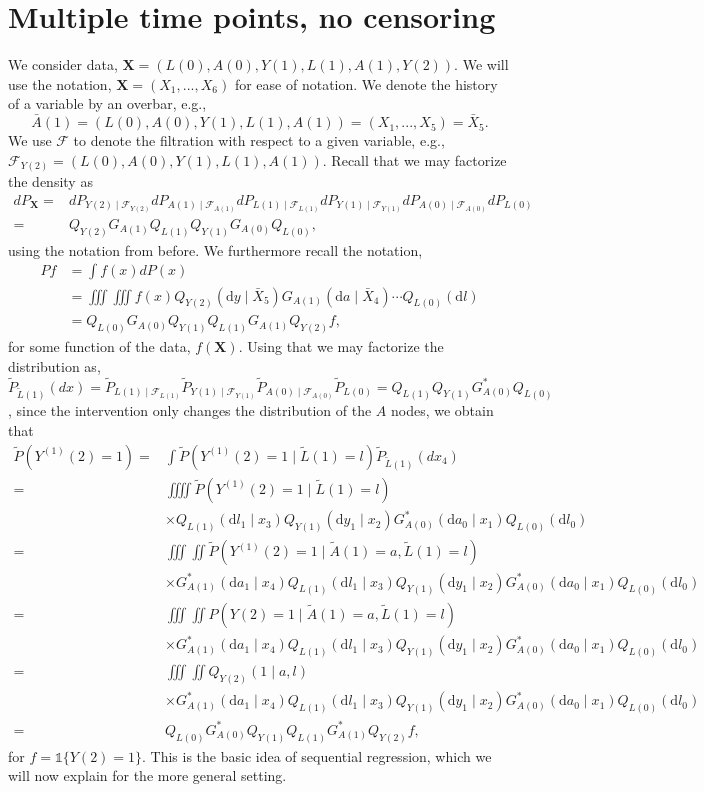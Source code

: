 \documentclass{article}
\newcommand{\A}[1]{A(#1)}
\renewcommand{\L}[1]{L(#1)}
\newcommand{\Y}[1]{Y(#1)}
\newcommand{\Ystar}[2]{Y^{(#1)}(#2)}
\newcommand{\F}[2]{\mathcal{F}_{#1(#2)}}
\newcommand{\Lbar}[1]{\tilde{L}(#1)}
\newcommand{\Abar}[1]{\tilde{A}(#1)}
\renewcommand{\d}{\ensuremath{\mathrm{d}}}
\begin{document}
\section{Multiple time points, no censoring}
We consider data, $\textbf{X}=(\L{0},\A{0},\Y{1},\L{1},\A{1},\Y{2}).$ We will use the notation, $\textbf{X}=(X_1,...,X_6)$ for ease of notation. We denote the history of a variable by an overbar, e.g., $$\bar{A}(1)=(\L{0},\A{0},\Y{1},\L{1},\A{1})=(X_1,...,X_5)=\bar{X}_5.$$ We use $\mathcal{F}$ to denote the filtration with respect to a given variable, e.g., $\F{Y}{2}=(\L{0},\A{0},\Y{1},\L{1},\A{1})$. Recall that we may factorize the density as 
\begin{align*}
dP_{\textbf{X}}=&dP_{\Y{2}\mid \F{Y}{2}}dP_{\A{1}\mid \F{A}{1}}dP_{\L{1}\mid \F{L}{1}}dP_{\Y{1}\mid \F{Y}{1}}dP_{\A{0}\mid \F{A}{0}}dP_{\L{0}}\\
=&Q_{\Y{2}}G_{\A{1}}Q_{\L{1}}Q_{\Y{1}}G_{\A{0}}Q_{\L{0}},
\end{align*}
using the notation from before. We furthermore recall the notation,
\begin{align*}
    Pf&=\int f(x) dP(x)\\&=\iiint\!\!\!\iiint f(x) Q_{\Y{2}}(\d y\mid \bar{X}_5)G_{\A{1}}(\d a\mid \bar{X}_4)\cdots Q_{\L{0}}(\d l)\\&=Q_{\L{0}}G_{\A{0}}Q_{\Y{1}}Q_{\L{1}}G_{\A{1}}Q_{\Y{2}}f,
\end{align*}
for some function of the data, $f(\textbf{X}).$ Using that we may factorize the distribution as, $\tilde{P}_{\Lbar{1}}(dx)=\tilde{P}_{\L{1}\mid \F{L}{1}}\tilde{P}_{\Y{1}\mid \F{Y}{1}}\tilde{P}_{\A{0}\mid \F{A}{0}}\tilde{P}_{\L{0}}=Q_{\L{1}}Q_{\Y{1}}G^*_{\A{0}}Q_{\L{0}}$, since the intervention only changes the distribution of the $A$ nodes, we obtain that
\begin{align*}
    \tilde{P}(\Ystar{1}{2}=1)=&\int\tilde{P}(\Ystar{1}{2}=1\mid\Lbar{1} = l)\tilde{P}_{\Lbar{1}}(dx_4)\\
    =&\iiiint\tilde{P}(\Ystar{1}{2}=1\mid\Lbar{1} = l)\\
    &\times Q_{\L{1}}(\d l_1\mid x_3)Q_{\Y{1}}(\d y_1\mid x_2)G^*_{\A{0}}(\d a_0\mid x_1)Q_{\L{0}}(\d l_0)\\
    =&\iiint\!\!\!\iint\tilde{P}(\Ystar{1}{2}=1\mid\Abar{1}=a,\Lbar{1} = l)\\
    &\times G^*_{\A{1}}(\d a_1\mid x_4)Q_{\L{1}}(\d l_1\mid x_3)Q_{\Y{1}}(\d y_1\mid x_2)G^*_{\A{0}}(\d a_0\mid x_1)Q_{\L{0}}(\d l_0)\\
    =&\iiint\!\!\!\iint P(\Y{2}=1\mid\Abar{1}=a,\Lbar{1} = l)\\
    &\times G^*_{\A{1}}(\d a_1\mid x_4)Q_{\L{1}}(\d l_1\mid x_3)Q_{\Y{1}}(\d y_1\mid x_2) G^*_{\A{0}}(\d a_0\mid x_1)Q_{\L{0}}(\d l_0)\\
    =&\iiint\!\!\!\iint  Q_{\Y{2}}(1\mid a, l)\\
    &\times G^*_{\A{1}}(\d a_1\mid x_4)Q_{\L{1}}(\d l_1\mid x_3)Q_{\Y{1}}(\d y_1\mid x_2) G^*_{\A{0}}(\d a_0\mid x_1)Q_{\L{0}}(\d l_0)\\
    =&Q_{\L{0}}G^*_{\A{0}}Q_{\Y{1}}Q_{\L{1}}G^*_{\A{1}}Q_{\Y{2}}f,
    \end{align*}
    for $f = \mathds{1}\{\Y{2}=1\}$. This is the basic idea of sequential regression, which we will now explain for the more general setting. 
\end{document}
